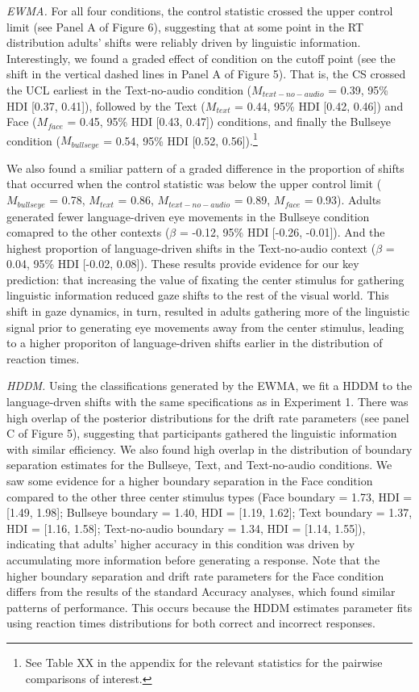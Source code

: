 \documentclass[english,floatsintext,man]{apa6}
\theoremstyle{definition}
\theoremstyle{definition}
\theoremstyle{definition}
\theoremstyle{remark}
\begin{document}
\emph{EWMA.} For all four conditions, the control statistic crossed the
upper control limit (see Panel A of Figure 6), suggesting that at some
point in the RT distribution adults' shifts were reliably driven by
linguistic information. Interestingly, we found a graded effect of
condition on the cutoff point (see the shift in the vertical dashed
lines in Panel A of Figure 5). That is, the CS crossed the UCL earliest
in the Text-no-audio condition (\(M_{text-no-audio}\) = 0.39, 95\% HDI
{[}0.37, 0.41{]}), followed by the Text (\(M_{text}\) = 0.44, 95\% HDI
{[}0.42, 0.46{]}) and Face (\(M_{face}\) = 0.45, 95\% HDI {[}0.43,
0.47{]}) conditions, and finally the Bullseye condition
(\(M_{bullseye}\) = 0.54, 95\% HDI {[}0.52, 0.56{]}).\footnote{See Table
  XX in the appendix for the relevant statistics for the pairwise
  comparisons of interest.}

We also found a smiliar pattern of a graded difference in the proportion
of shifts that occurred when the control statistic was below the upper
control limit (\(M_{bullseye}\) = 0.78, \(M_{text}\) = 0.86,
\(M_{text-no-audio}\) = 0.89, \(M_{face}\) = 0.93). Adults generated
fewer language-driven eye movements in the Bullseye condition comapred
to the other contexts (\(\beta\) = -0.12, 95\% HDI {[}-0.26, -0.01{]}).
And the highest proportion of language-driven shifts in the
Text-no-audio context (\(\beta\) = 0.04, 95\% HDI {[}-0.02, 0.08{]}).
These results provide evidence for our key prediction: that increasing
the value of fixating the center stimulus for gathering linguistic
information reduced gaze shifts to the rest of the visual world. This
shift in gaze dynamics, in turn, resulted in adults gathering more of
the linguistic signal prior to generating eye movements away from the
center stimulus, leading to a higher proporiton of language-driven
shifts earlier in the distribution of reaction times.

\emph{HDDM.} Using the classifications generated by the EWMA, we fit a
HDDM to the language-drven shifts with the same specifications as in
Experiment 1. There was high overlap of the posterior distributions for
the drift rate parameters (see panel C of Figure 5), suggesting that
participants gathered the linguistic information with similar
efficiency. We also found high overlap in the distribution of boundary
separation estimates for the Bullseye, Text, and Text-no-audio
conditions. We saw some evidence for a higher boundary separation in the
Face condition compared to the other three center stimulus types (Face
boundary = 1.73, HDI = {[}1.49, 1.98{]}; Bullseye boundary = 1.40, HDI =
{[}1.19, 1.62{]}; Text boundary = 1.37, HDI = {[}1.16, 1.58{]};
Text-no-audio boundary = 1.34, HDI = {[}1.14, 1.55{]}), indicating that
adults' higher accuracy in this condition was driven by accumulating
more information before generating a response. Note that the higher
boundary separation and drift rate parameters for the Face condition
differs from the results of the standard Accuracy analyses, which found
similar patterns of performance. This occurs because the HDDM estimates
parameter fits using reaction times distributions for both correct and
incorrect responses.
\end{document}
